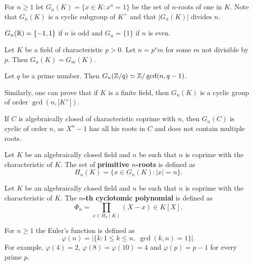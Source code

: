 \chapter{}


For $n\geq1$ let $G_n(K)=\{x\in K:x^n=1\}$ be the 
set of $n$-roots of one in $K$. Note that
$G_n(K)$ is a cyclic subgroup of $K^{\times}$ and that 
$|G_n(K)|$ divides $n$. 

\begin{example}
    $G_n(\mathbb{R})=\{-1,1\}$ if $n$ is odd and $G_{n}=\{1\}$ if $n$ is even.
\end{example}

\begin{exercise}
    Let $K$ be a field of characteristic $p>0$. Let $n=p^sm$ for some $m$ not divisible by $p$. 
    Then $G_n(K)=G_m(K)$. 
\end{exercise}

\begin{exercise}
    Let $q$ be a prime number. Then $G_n(\mathbb{Z}/q)\simeq\mathbb{Z}/\gcd(n,q-1)$. 
\end{exercise}

Similarly, one can prove that if $K$ is a finite field, then $G_n(K)$ is a cyclic group
of order $\gcd(n,|K^{\times}|)$. 

\begin{example}
    If $C$ is algebraically closed of characteristic coprime with $n$, 
    then $G_n(C)$ is cyclic of order $n$, as $X^n-1$ 
    has all his roots in $C$ and does not contain multiple roots. 
\end{example}

Let $K$ be an algebraically closed field and $n$ be
such that $n$ is coprime with the characteristic of $K$. The set of 
\textbf{primitive $n$-roots} is defined as 
\[
H_n(K)=\{x\in G_n(K):|x|=n\}.
\]

\begin{definition}
    Let $K$ be an algebraically closed field and $n$ be
    such that $n$ is coprime with the characteristic of $K$. The \textbf{$n$-th cyclotomic
    polynomial} is defined as 
    \[
    \Phi_n=\prod_{x\in H_n(K)}(X-x)\in K[X].
    \]
\end{definition}

For $n\geq1$ the Euler's function is defined as 
\[
\varphi(n)=|\{k:1\leq k\leq n,\;\gcd(k,n)=1\}|.
\]
For example, $\varphi(4)=2$, $\varphi(8)=\varphi(10)=4$ and $\varphi(p)=p-1$ for every prime $p$. 

